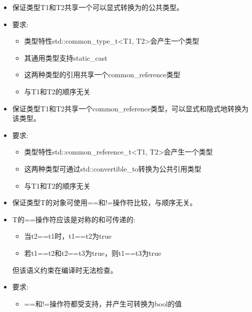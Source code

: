 \begin{itemize}
\item
保证类型T1和T2共享一个可以显式转换为的公共类型。

\item
要求:
\begin{itemize}
\item
类型特性std::common\_type\_t<T1, T2>会产生一个类型

\item
其通用类型支持static\_cast

\item
这两种类型的引用共享一个common\_reference类型

\item
与T1和T2的顺序无关
\end{itemize}
\end{itemize}


\begin{itemize}
\item
保证类型T1和T2共享一个common\_reference类型，可以显式和隐式地转换为该类型。

\item
要求:
\begin{itemize}
\item
类型特性std::common\_reference\_t<T1, T2>会产生一个类型

\item
这两种类型可通过std::convertible\_to转换为公共引用类型

\item
与T1和T2的顺序无关
\end{itemize}
\end{itemize}



\begin{itemize}
\item
保证类型T的对象可使用==和!=操作符比较，与顺序无关。

\item
T的==操作符应该是对称的和可传递的:
\begin{itemize}
\item
当t2==t1时，t1==t2为true

\item
若t1==t2和t2==t3为true，则t1==t3为true
\end{itemize}

但该语义约束在编译时无法检查。

\item
要求:
\begin{itemize}
\item
==和!=操作符都受支持，并产生可转换为bool的值
\end{itemize}
\end{itemize}

